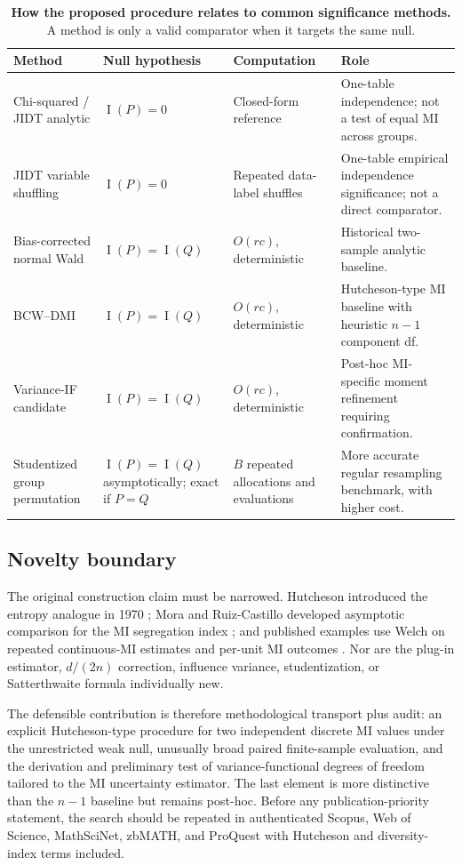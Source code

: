 \documentclass[10pt,twocolumn]{article}
\newcommand{\MI}{\operatorname{I}}
\newcommand{\method}{BCW--DMI}
\begin{document}
\begin{table}[t]
\centering
\caption{\textbf{How the proposed procedure relates to common significance
methods.} A method is only a valid comparator when it targets the same null.}
\label{tab:methods}
\small
\begin{tabular}{@{}p{}p{}p{}p{}@{}}
\toprule
Method & Null hypothesis & Computation & Role\\
\midrule
Chi-squared / JIDT analytic & \(\MI(P)=0\) & Closed-form reference &
One-table independence; not a test of equal MI across groups.\\
JIDT variable shuffling & \(\MI(P)=0\) & Repeated data-label shuffles &
One-table empirical independence significance; not a direct comparator.\\
Bias-corrected normal Wald & \(\MI(P)=\MI(Q)\) & \(O(rc)\), deterministic &
Historical two-sample analytic baseline.\\
\method & \(\MI(P)=\MI(Q)\) & \(O(rc)\), deterministic &
Hutcheson-type MI baseline with heuristic \(n-1\) component df.\\
Variance-IF candidate & \(\MI(P)=\MI(Q)\) & \(O(rc)\), deterministic &
Post-hoc MI-specific moment refinement requiring confirmation.\\
Studentized group permutation & \(\MI(P)=\MI(Q)\) asymptotically; exact if \(P=Q\) &
\(B\) repeated allocations and evaluations &
More accurate regular resampling benchmark, with higher cost.\\
\bottomrule
\end{tabular}
\end{table}

\subsection{Novelty boundary}

The original construction claim must be narrowed. Hutcheson introduced the
entropy analogue in 1970 \citep{hutcheson1970}; Mora and Ruiz-Castillo
developed asymptotic comparison for the MI segregation index
\citep{mora2009}; and published examples use Welch on repeated continuous-MI
estimates \citep{martin2026} and per-unit MI outcomes
\citep{prince2021}. Nor are the plug-in estimator, \(d/(2n)\) correction,
influence variance, studentization, or Satterthwaite formula individually new.

The defensible contribution is therefore methodological transport plus audit:
an explicit Hutcheson-type procedure for two independent discrete MI values
under the unrestricted weak null, unusually broad paired finite-sample
evaluation, and the derivation and preliminary test of variance-functional
degrees of freedom tailored to the MI uncertainty estimator. The last element
is more distinctive than the \(n-1\) baseline but remains post-hoc. Before any
publication-priority statement, the search should be repeated in
authenticated Scopus, Web of Science, MathSciNet, zbMATH, and ProQuest with
Hutcheson and diversity-index terms included.
\end{document}
